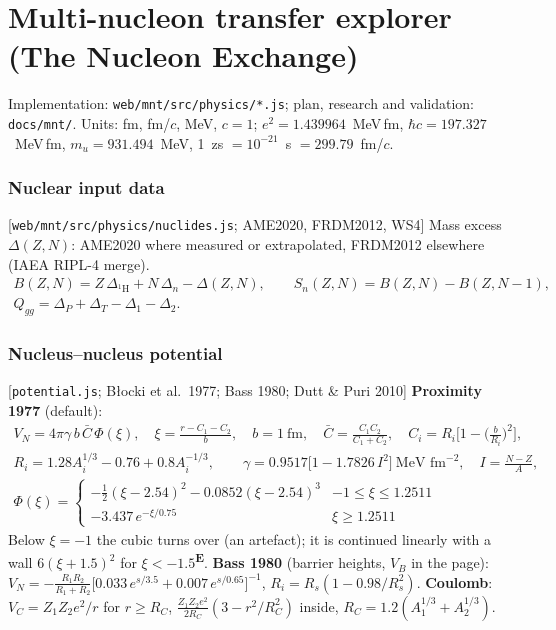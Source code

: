\documentclass[11pt,a4paper]{article}
\newcommand{\file}[1]{\texttt{\small #1}}
\newcommand{\src}[1]{\hfill{\small\color{gray}[#1]}}
\newcommand{\emp}{\textsuperscript{\color{orange!80!black}\textbf{E}}}
\begin{document}
\part*{Multi-nucleon transfer explorer (The Nucleon Exchange)}
Implementation: \file{web/mnt/src/physics/*.js}; plan, research and validation: \file{docs/mnt/}. Units: fm, fm/$c$,
MeV, $c=1$; $e^2 = 1.439964$~MeV\,fm, $\hbar c = 197.327$~MeV\,fm, $m_u = 931.494$~MeV,
1~zs $=10^{-21}$~s $=299.79$~fm/$c$.

\section{Nuclear input data}
\src{\file{web/mnt/src/physics/nuclides.js}; AME2020, FRDM2012, WS4}
Mass excess $\Delta(Z,N)$: AME2020 where measured or extrapolated, FRDM2012 elsewhere (IAEA RIPL-4 merge).
\begin{gather}
B(Z,N) = Z\,\Delta_{^1\text{H}} + N\,\Delta_n - \Delta(Z,N),\qquad S_n(Z,N) = B(Z,N)-B(Z,N-1),\\
Q_{gg} = \Delta_P + \Delta_T - \Delta_1 - \Delta_2 .
\end{gather}

\section{Nucleus--nucleus potential}
\src{\file{potential.js}; Błocki et al.\ 1977; Bass 1980; Dutt \& Puri 2010}
\textbf{Proximity 1977} (default):
\begin{gather}
V_N = 4\pi\gamma\,b\,\bar C\,\Phi(\xi),\quad \xi = \frac{r-C_1-C_2}{b},\quad b=1~\text{fm},\quad
\bar C = \frac{C_1C_2}{C_1+C_2},\quad C_i = R_i\Big[1-\Big(\frac{b}{R_i}\Big)^2\Big],\\
R_i = 1.28A_i^{1/3}-0.76+0.8A_i^{-1/3},\qquad \gamma = 0.9517\big[1-1.7826\,I^2\big]~\text{MeV fm}^{-2},\quad I=\frac{N-Z}{A},\\
\Phi(\xi) = \begin{cases}-\tfrac12(\xi-2.54)^2-0.0852(\xi-2.54)^3 & -1\le\xi\le1.2511\\ -3.437\,e^{-\xi/0.75} & \xi\ge1.2511\end{cases}
\end{gather}
Below $\xi=-1$ the cubic turns over (an artefact); it is continued linearly with a wall $6(\xi+1.5)^2$ for $\xi<-1.5$\emp.
\textbf{Bass 1980} (barrier heights, $V_B$ in the page):
$V_N = -\frac{R_1R_2}{R_1+R_2}\big[0.033\,e^{s/3.5}+0.007\,e^{s/0.65}\big]^{-1}$, $R_i = R_s(1-0.98/R_s^2)$.
\textbf{Coulomb}: $V_C = Z_1Z_2e^2/r$ for $r\ge R_C$, $\frac{Z_1Z_2e^2}{2R_C}(3-r^2/R_C^2)$ inside, $R_C = 1.2(A_1^{1/3}+A_2^{1/3})$.
\end{document}
